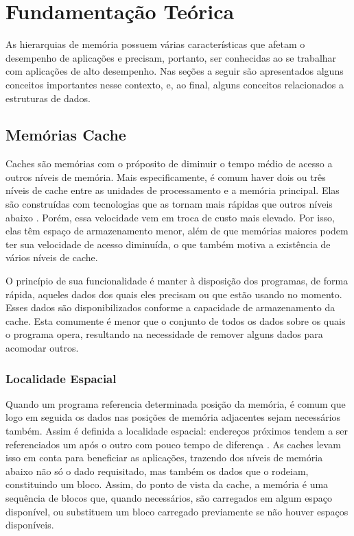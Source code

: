 \chapter{Fundamentação Teórica}
\label{cap:fundamentacao_teorica}
\acresetall


As hierarquias de memória possuem várias características que afetam o desempenho de aplicações e precisam, portanto, ser conhecidas ao se trabalhar com aplicações de alto desempenho.
Nas seções a seguir são apresentados alguns conceitos importantes nesse contexto, e, ao final, alguns conceitos relacionados a estruturas de dados.



\section{Memórias Cache}
\label{sec:memorias_cache}

Caches são memórias com o próposito de diminuir o tempo médio de acesso a outros níveis de memória. Mais especificamente, é comum haver dois ou três níveis de cache entre as unidades de processamento e a memória principal. Elas são construídas com tecnologias que as tornam mais rápidas que outros níveis abaixo \cite{Patterson}. Porém, essa velocidade vem em troca de custo mais elevado. Por isso, elas têm espaço de armazenamento menor, além de que memórias maiores podem ter sua velocidade de acesso diminuída, o que também motiva a existência de vários níveis de cache.

O princípio de sua funcionalidade é manter à disposição dos programas, de forma rápida, aqueles dados dos quais eles precisam ou que estão usando no momento. Esses dados são disponibilizados conforme a capacidade de armazenamento da cache. Esta comumente é menor que o conjunto de todos os dados sobre os quais o programa opera, resultando na necessidade de remover alguns dados para acomodar outros.

\subsection{Localidade Espacial}
\label{subsec:localidade_espacial}

Quando um programa referencia determinada posição da memória, é comum que logo em seguida os dados nas posições de memória adjacentes sejam necessários também. Assim é definida a localidade espacial: endereços próximos tendem a ser referenciados um após o outro com pouco tempo de diferença \cite{Patterson}. As caches levam isso em conta para beneficiar as aplicações, trazendo dos níveis de memória abaixo não só o dado requisitado, mas também os dados que o rodeiam, constituindo um bloco. Assim, do ponto de vista da cache, a memória é uma sequência de blocos que, quando necessários, são carregados em algum espaço disponível, ou substituem um bloco carregado previamente se não houver espaços disponíveis.

